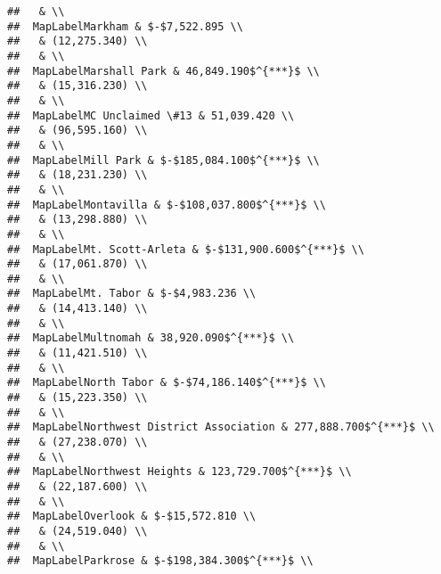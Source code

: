\documentclass[]{article}
\begin{document}
\begin{verbatim}
##   & \\ 
##  MapLabelMarkham & $-$7,522.895 \\ 
##   & (12,275.340) \\ 
##   & \\ 
##  MapLabelMarshall Park & 46,849.190$^{***}$ \\ 
##   & (15,316.230) \\ 
##   & \\ 
##  MapLabelMC Unclaimed \#13 & 51,039.420 \\ 
##   & (96,595.160) \\ 
##   & \\ 
##  MapLabelMill Park & $-$185,084.100$^{***}$ \\ 
##   & (18,231.230) \\ 
##   & \\ 
##  MapLabelMontavilla & $-$108,037.800$^{***}$ \\ 
##   & (13,298.880) \\ 
##   & \\ 
##  MapLabelMt. Scott-Arleta & $-$131,900.600$^{***}$ \\ 
##   & (17,061.870) \\ 
##   & \\ 
##  MapLabelMt. Tabor & $-$4,983.236 \\ 
##   & (14,413.140) \\ 
##   & \\ 
##  MapLabelMultnomah & 38,920.090$^{***}$ \\ 
##   & (11,421.510) \\ 
##   & \\ 
##  MapLabelNorth Tabor & $-$74,186.140$^{***}$ \\ 
##   & (15,223.350) \\ 
##   & \\ 
##  MapLabelNorthwest District Association & 277,888.700$^{***}$ \\ 
##   & (27,238.070) \\ 
##   & \\ 
##  MapLabelNorthwest Heights & 123,729.700$^{***}$ \\ 
##   & (22,187.600) \\ 
##   & \\ 
##  MapLabelOverlook & $-$15,572.810 \\ 
##   & (24,519.040) \\ 
##   & \\ 
##  MapLabelParkrose & $-$198,384.300$^{***}$ \\ 

\end{verbatim}
\end{document}
